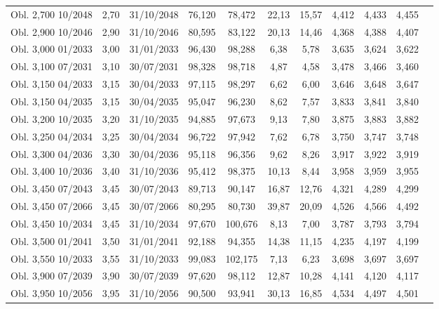 \documentclass[a4paper,12pt]{article}
\begin{document}
\begin{longtable}{lcccccccccc}
Obl. 2,700 10/2048 & 2{,}70 & 31/10/2048 & 76{,}120 & 78{,}472 & 22{,}13 & 15{,}57 & 4{,}412 & 4{,}433 & 4{,}455 \\
Obl. 2,900 10/2046 & 2{,}90 & 31/10/2046 & 80{,}595 & 83{,}122 & 20{,}13 & 14{,}46 & 4{,}368 & 4{,}388 & 4{,}407 \\
Obl. 3,000 01/2033 & 3{,}00 & 31/01/2033 & 96{,}430 & 98{,}288 & 6{,}38 & 5{,}78 & 3{,}635 & 3{,}624 & 3{,}622 \\
Obl. 3,100 07/2031 & 3{,}10 & 30/07/2031 & 98{,}328 & 98{,}718 & 4{,}87 & 4{,}58 & 3{,}478 & 3{,}466 & 3{,}460 \\
Obl. 3,150 04/2033 & 3{,}15 & 30/04/2033 & 97{,}115 & 98{,}297 & 6{,}62 & 6{,}00 & 3{,}646 & 3{,}648 & 3{,}647 \\
Obl. 3,150 04/2035 & 3{,}15 & 30/04/2035 & 95{,}047 & 96{,}230 & 8{,}62 & 7{,}57 & 3{,}833 & 3{,}841 & 3{,}840 \\
Obl. 3,200 10/2035 & 3{,}20 & 31/10/2035 & 94{,}885 & 97{,}673 & 9{,}13 & 7{,}80 & 3{,}875 & 3{,}883 & 3{,}882 \\
Obl. 3,250 04/2034 & 3{,}25 & 30/04/2034 & 96{,}722 & 97{,}942 & 7{,}62 & 6{,}78 & 3{,}750 & 3{,}747 & 3{,}748 \\
Obl. 3,300 04/2036 & 3{,}30 & 30/04/2036 & 95{,}118 & 96{,}356 & 9{,}62 & 8{,}26 & 3{,}917 & 3{,}922 & 3{,}919 \\
Obl. 3,400 10/2036 & 3{,}40 & 31/10/2036 & 95{,}412 & 98{,}375 & 10{,}13 & 8{,}44 & 3{,}958 & 3{,}959 & 3{,}955 \\
Obl. 3,450 07/2043 & 3{,}45 & 30/07/2043 & 89{,}713 & 90{,}147 & 16{,}87 & 12{,}76 & 4{,}321 & 4{,}289 & 4{,}299 \\
Obl. 3,450 07/2066 & 3{,}45 & 30/07/2066 & 80{,}295 & 80{,}730 & 39{,}87 & 20{,}09 & 4{,}526 & 4{,}566 & 4{,}492 \\
Obl. 3,450 10/2034 & 3{,}45 & 31/10/2034 & 97{,}670 & 100{,}676 & 8{,}13 & 7{,}00 & 3{,}787 & 3{,}793 & 3{,}794 \\
Obl. 3,500 01/2041 & 3{,}50 & 31/01/2041 & 92{,}188 & 94{,}355 & 14{,}38 & 11{,}15 & 4{,}235 & 4{,}197 & 4{,}199 \\
Obl. 3,550 10/2033 & 3{,}55 & 31/10/2033 & 99{,}083 & 102{,}175 & 7{,}13 & 6{,}23 & 3{,}698 & 3{,}697 & 3{,}697 \\
Obl. 3,900 07/2039 & 3{,}90 & 30/07/2039 & 97{,}620 & 98{,}112 & 12{,}87 & 10{,}28 & 4{,}141 & 4{,}120 & 4{,}117 \\
Obl. 3,950 10/2056 & 3{,}95 & 31/10/2056 & 90{,}500 & 93{,}941 & 30{,}13 & 16{,}85 & 4{,}534 & 4{,}497 & 4{,}501 \\

\end{longtable}
\end{document}
